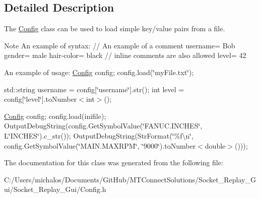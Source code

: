 \subsection{Detailed Description}
The \hyperlink{class_nist_1_1_config}{Config} class can be used to load simple key/value pairs from a file.

\begin{DoxyNote}{Note}
An example of syntax\+: // An example of a comment username= Bob gender= male hair-\/color= black // inline comments are also allowed level= 42

An example of usage\+: \hyperlink{class_nist_1_1_config}{Config} config; config.\+load(\char`\"{}my\+File.\+txt\char`\"{});
\end{DoxyNote}
std\+::string username = config\mbox{[}\char`\"{}username\char`\"{}\mbox{]}.str(); int level = config\mbox{[}\char`\"{}level\char`\"{}\mbox{]}.to\+Number$<$int$>$();

\hyperlink{class_nist_1_1_config}{Config} config; config.\+load(inifile); Output\+Debug\+String(config.\+Get\+Symbol\+Value(\char`\"{}\+F\+A\+N\+U\+C.\+I\+N\+C\+H\+E\+S\char`\"{}, L\char`\"{}\+I\+N\+C\+H\+E\+S\char`\"{}).c\+\_\+str()); Output\+Debug\+String(Str\+Format(\char`\"{}\%f\textbackslash{}n\char`\"{}, config.\+Get\+Symbol\+Value(\char`\"{}\+M\+A\+I\+N.\+M\+A\+X\+R\+P\+M\char`\"{}, \char`\"{}9000\char`\"{}).to\+Number$<$double$>$())); 

The documentation for this class was generated from the following file\+:\begin{DoxyCompactItemize}
\item 
C\+:/\+Users/michalos/\+Documents/\+Git\+Hub/\+M\+T\+Connect\+Solutions/\+Socket\+\_\+\+Replay\+\_\+\+Gui/\+Socket\+\_\+\+Replay\+\_\+\+Gui/Config.\+h\end{DoxyCompactItemize}
